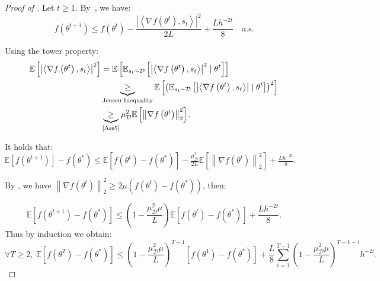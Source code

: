 \documentclass{article} %
\begin{document}
\begin{proof}[Proof of ]

Let \( t \ge 1 \). By~, we have: 
\[ 
f(\theta^{t+1}) \leq f(\theta^t) - \frac{\left|\left\langle \nabla f(\theta^t), s_t \right\rangle\right|^2}{2L} + \frac{Lh^{-2t}}{8} \quad \text{a.s.} 
\]


Using the tower property: 
\begin{align*}
\mathbb{E}\left[\left|\left\langle\nabla f\left(\theta^t \right), s_t\right\rangle\right|^2\right] 
&= \mathbb{E}\left[\mathbb{E}_{s_t\sim \mathcal{D}}\left[\left|\left\langle\nabla f\left(\theta^t\right), s_t\right\rangle\right|^2 \mid \theta^t\right]\right] \\
&\underbrace{\geq}_{\text{Jensen Inequality}} \mathbb{E}\left[\left(\mathbb{E}_{s_t\sim \mathcal{D}}\left[\left|\left\langle\nabla f\left(\theta^t\right), s_t\right\rangle\right| \mid \theta^t\right]\right)^2\right] \\
&\underbrace{\geq}_{\text{\Cref{Ass5}}} \mu_{\mathcal{D}}^2 \mathbb{E}\left[\left\|\nabla f\left(\theta^t\right)\right\|_{2}^2\right].
\end{align*}




It holds that:
$
\mathbb{E}\left[f\left(\theta^{t+1} \right)\right]- f(\theta^{*}) \leq \mathbb{E}\left[f\left(\theta^{t} \right)- f(\theta^{*})\right]-\frac{\mu_{\mathcal{D}}^2}{2 L} \mathbb{E}\left[\left\|\nabla f\left( \theta^t \right)\right\|_2^2\right]+\frac{L h^{-2t}}{8}.
$

By , we have $\left\|\nabla f\left(\theta^t\right)\right\|_2^2 \geq 2 \mu\left(f\left(\theta^t\right)-f(\theta^{*}) \right)$, then:

$$
\mathbb{E}\left[f\left(\theta^{t+1} \right)- f(\theta^{*})\right] \leq \left(1-\frac{\mu_{\mathcal{D}}^2 \mu}{L}\right) \mathbb{E}\left[f\left(\theta^{t} \right)- f(\theta^{*})\right]+\frac{L h^{-2t}}{8}.
$$ 
Thus by induction we obtain: $$\forall T \ge 2, \;
\mathbb{E}[f(\theta^{T})-f(\theta^{*})  ]  \leq\left(1-\frac{\mu_{\mathcal{D}}^2 \mu}{L}\right)^{T-1} [f(\theta^{1})-f(\theta^{*})  ]+ \frac{L}{8}\sum_{i=1}^{T-1}\left(1-\frac{\mu_{\mathcal{D}}^2 \mu}{L}\right)^{T-1-i} h^{-2i}.$$
\end{proof}
\end{document}
